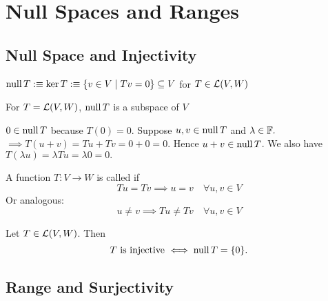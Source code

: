 \section{Null Spaces and Ranges}

\subsection{Null Space and Injectivity}

\begin{mydef} 
  $\operatorname{null} T :\equiv \ker T :\equiv \{ v \in V \mid Tv=0\} \subseteq V$ for $T \in {\mathcal{L}(V,W)}$
\end{mydef}

\setcounter{thm}{12}
\begin{thm} 
  For $T=\mathcal{L}(V, W)$, $\operatorname{null} T$ is a subspace of $V$
\end{thm}
\begin{prf}
  $0 \in \operatorname{null} T$ because $T(0) = 0$. Suppose $u,v \in \operatorname{null} T$ and $\lambda \in \mathbb{F}.$ $\implies T(u+v)=Tu+Tv=0+0=0.$ Hence $u+v \in \operatorname{null} T$. We also have $T(\lambda u)= \lambda Tu = \lambda 0 = 0.$
\end{prf}

\setcounter{thm}{13}
\begin{mydef} [injectivity]
  \label{def: injectivity}
  A function $T: V \to W$ is called  if
  \begin{equation}
    Tu = Tv \implies u = v \quad \forall u,v \in V
  \end{equation}
  Or analogous:
  \begin{equation}
    u \neq v \implies Tu \neq Tv \quad \forall u,v \in V
  \end{equation}
\end{mydef}

\setcounter{thm}{14}
\begin{thm} 
  \label{thm: injectivity iff null space equals zero-set}
  Let $T \in \mathcal{L}(V,W)$. Then
  \begin{equation}
    T $ is injective $ \iff \mynull T = \{0 \}.
  \end{equation}
\end{thm}

\subsection{Range and Surjectivity}

